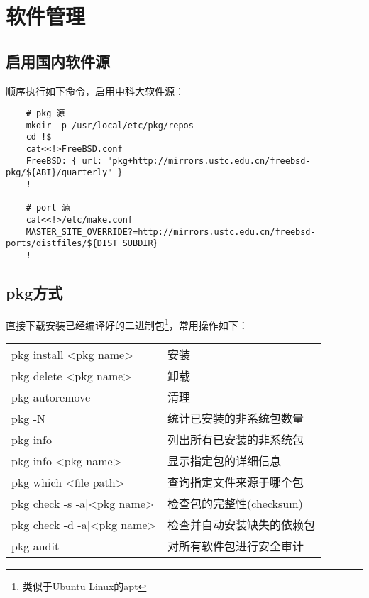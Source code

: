 \section{软件管理}

\subsection{启用国内软件源}

顺序执行如下命令，启用中科大软件源：
\begin{lstlisting}
    # pkg 源
    mkdir -p /usr/local/etc/pkg/repos
    cd !$
    cat<<!>FreeBSD.conf
    FreeBSD: { url: "pkg+http://mirrors.ustc.edu.cn/freebsd-pkg/${ABI}/quarterly" }
    !

    # port 源
    cat<<!>/etc/make.conf
    MASTER_SITE_OVERRIDE?=http://mirrors.ustc.edu.cn/freebsd-ports/distfiles/${DIST_SUBDIR}
    !
\end{lstlisting}

\subsection{pkg方式}
直接下载安装已经编译好的二进制包\footnote{类似于Ubuntu Linux的apt}，常用操作如下：

\vspace{1ex}
\begin{minipage}{\textwidth}
    \small
    \begin{tabular}{|l|l|}
        \hline
        pkg install <pkg name>&安装\\
        pkg delete <pkg name>&卸载\\
        pkg autoremove&清理\\
        pkg -N&统计已安装的非系统包数量\\
        pkg info&列出所有已安装的非系统包\\
        pkg info <pkg name>&显示指定包的详细信息\\
        pkg which <file path>&查询指定文件来源于哪个包\\
        pkg check -s -a|<pkg name>&检查包的完整性(checksum)\\
        pkg check -d -a|<pkg name>&检查并自动安装缺失的依赖包\\
        pkg audit&对所有软件包进行安全审计\\
        \hline
    \end{tabular}
\end{minipage}

